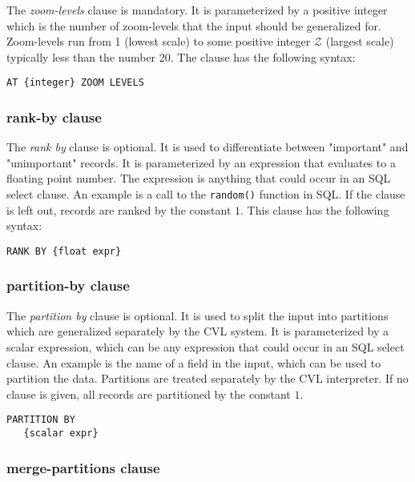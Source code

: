 The \emph{zoom-levels} clause is mandatory. It is parameterized by a positive integer which is the number of zoom-levels that the input should be generalized for. Zoom-levels run from 1 (lowest scale) to some positive integer $\mathcal{Z}$ (largest scale) typically less than the number 20. The clause has the following syntax:

\begin{lstlisting}
AT {integer} ZOOM LEVELS
\end{lstlisting}

\subsubsection{rank-by clause}

The \emph{rank by} clause is optional. It is used to differentiate between "important" and "unimportant" records. It is parameterized by an expression that evaluates to a floating point number. The expression is anything that could occur in an SQL select clause. An example is a call to the \texttt{random()} function in SQL. If the clause is left out, records are ranked by the constant $1$. This clause has the following syntax:

\begin{lstlisting}
RANK BY {float expr}
\end{lstlisting}

\subsubsection{partition-by clause}

The \emph{partition by} clause is optional. It is used to split the input into partitions which are generalized separately by the CVL system. It is parameterized by a scalar expression, which can be any expression that could occur in an SQL select clause. An example is the name of a field in the input, which can be used to partition the data. Partitions are treated separately by the CVL interpreter. If no clause is given, all records are partitioned by the constant $1$. 

\begin{lstlisting}
PARTITION BY
   {scalar expr}
\end{lstlisting}

\subsubsection{merge-partitions clause}

